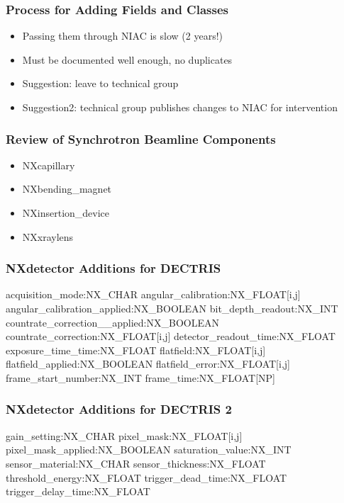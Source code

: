 \documentclass{beamer}
\begin{document}
\begin{frame}
\frametitle{Process for Adding Fields and Classes}
\begin{itemize}
\item Passing them through NIAC is slow (2 years!)
\item Must be documented well enough, no duplicates
\item Suggestion: leave to technical group
\item Suggestion2: technical group publishes changes to NIAC for intervention
\end{itemize}
\end{frame}

\begin{frame}
\frametitle{Review of Synchrotron Beamline Components}
\begin{itemize}
\item NXcapillary
\item NXbending\_magnet
\item NXinsertion\_device
\item NXxraylens
\end{itemize}
\end{frame}


\begin{frame}[fragile] 
\frametitle{NXdetector Additions for DECTRIS}
\begin{semiverbatim}
  acquisition\_mode:NX\_CHAR
  angular\_calibration:NX\_FLOAT[i,j]
  angular\_calibration\_applied:NX\_BOOLEAN
  bit\_depth\_readout:NX\_INT
  countrate\_correction\_\_applied:NX\_BOOLEAN
  countrate\_correction:NX\_FLOAT[i,j]
  detector\_readout\_time:NX\_FLOAT
  exposure\_time\_time:NX\_FLOAT
  flatfield:NX\_FLOAT[i,j]
  flatfield\_applied:NX\_BOOLEAN
  flatfield\_error:NX\_FLOAT[i,j]
  frame\_start\_number:NX\_INT
  frame\_time:NX\_FLOAT[NP]
\end{semiverbatim}
\end{frame}

\begin{frame}[fragile] 
\frametitle{NXdetector Additions for DECTRIS 2}
\begin{semiverbatim}
  gain\_setting:NX\_CHAR
  pixel\_mask:NX\_FLOAT[i,j]
  pixel\_mask\_applied:NX\_BOOLEAN
  saturation\_value:NX\_INT
  sensor\_material:NX\_CHAR
  sensor\_thickness:NX\_FLOAT
  threshold\_energy:NX\_FLOAT
  trigger\_dead\_time:NX\_FLOAT
  trigger\_delay\_time:NX\_FLOAT
\end{semiverbatim}
\end{frame}
\end{document}
